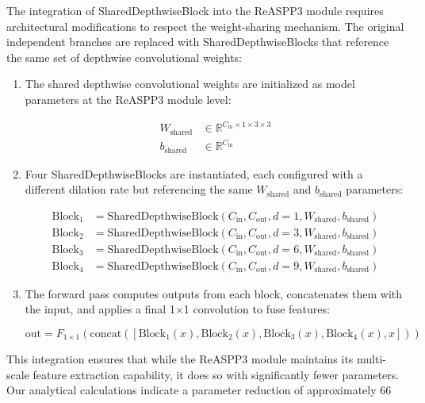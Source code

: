 \documentclass[12pt,a4paper]{article}
\begin{document}
The integration of SharedDepthwiseBlock into the ReASPP3 module requires architectural modifications to respect the weight-sharing mechanism. The original independent branches are replaced with SharedDepthwiseBlocks that reference the same set of depthwise convolutional weights:

\begin{enumerate}
\item The shared depthwise convolutional weights are initialized as model parameters at the ReASPP3 module level:
   
   \begin{align}
   W_{\textrm{shared}} &\in \mathbb{R}^{C_{\textrm{in}} \times 1 \times 3 \times 3} \\
   b_{\textrm{shared}} &\in \mathbb{R}^{C_{\textrm{in}}}
   \end{align}

\item Four SharedDepthwiseBlocks are instantiated, each configured with a different dilation rate but referencing the same $W_{\textrm{shared}}$ and $b_{\textrm{shared}}$ parameters:
   
   \begin{align}
   \textrm{Block}_1 &= \textrm{SharedDepthwiseBlock}(C_{\textrm{in}}, C_{\textrm{out}}, d=1, W_{\textrm{shared}}, b_{\textrm{shared}}) \\
   \textrm{Block}_2 &= \textrm{SharedDepthwiseBlock}(C_{\textrm{in}}, C_{\textrm{out}}, d=3, W_{\textrm{shared}}, b_{\textrm{shared}}) \\
   \textrm{Block}_3 &= \textrm{SharedDepthwiseBlock}(C_{\textrm{in}}, C_{\textrm{out}}, d=6, W_{\textrm{shared}}, b_{\textrm{shared}}) \\
   \textrm{Block}_4 &= \textrm{SharedDepthwiseBlock}(C_{\textrm{in}}, C_{\textrm{out}}, d=9, W_{\textrm{shared}}, b_{\textrm{shared}})
   \end{align}

\item The forward pass computes outputs from each block, concatenates them with the input, and applies a final 1×1 convolution to fuse features:
   
   \begin{equation}
   \textrm{out} = F_{1 \times 1}(\textrm{concat}([\textrm{Block}_1(x), \textrm{Block}_2(x), \textrm{Block}_3(x), \textrm{Block}_4(x), x]))
   \end{equation}
\end{enumerate}

This integration ensures that while the ReASPP3 module maintains its multi-scale feature extraction capability, it does so with significantly fewer parameters. Our analytical calculations indicate a parameter reduction of approximately 66%
\end{document}
